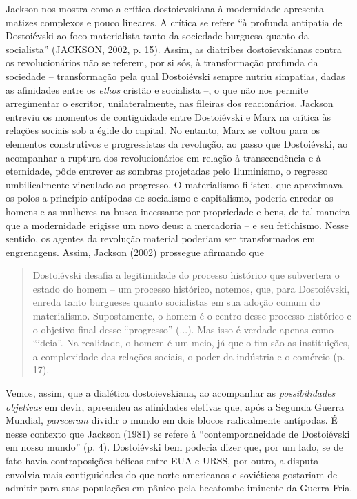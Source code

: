 Jackson nos mostra como a crítica dostoievskiana à modernidade apresenta
matizes complexos e pouco lineares. A crítica se refere ``à profunda
antipatia de Dostoiévski ao foco materialista tanto da sociedade
burguesa quanto da socialista'' (JACKSON, 2002, p. 15). Assim, as
diatribes dostoievskianas contra os revolucionários não se referem, por
si sós, à transformação profunda da sociedade -- transformação pela qual
Dostoiévski sempre nutriu simpatias, dadas as afinidades entre os
\emph{ethos} cristão e socialista --, o que não nos permite arregimentar
o escritor, unilateralmente, nas fileiras dos reacionários. Jackson
entreviu os momentos de contiguidade entre Dostoiévski e Marx na crítica
às relações sociais sob a égide do capital. No entanto, Marx se voltou
para os elementos construtivos e progressistas da revolução, ao passo
que Dostoiévski, ao acompanhar a ruptura dos revolucionários em relação
à transcendência e à eternidade, pôde entrever as sombras projetadas
pelo Iluminismo, o regresso umbilicalmente vinculado ao progresso. O
materialismo filisteu, que aproximava os polos a princípio antípodas de
socialismo e capitalismo, poderia enredar os homens e as mulheres na
busca incessante por propriedade e bens, de tal maneira que a
modernidade erigisse um novo deus: a mercadoria -- e seu fetichismo.
Nesse sentido, os agentes da revolução material poderiam ser
transformados em engrenagens. Assim, Jackson (2002) prossegue afirmando
que

\begin{quote}
Dostoiévski desafia a legitimidade do processo histórico que subvertera
o estado do homem -- um processo histórico, notemos, que, para
Dostoiévski, enreda tanto burgueses quanto socialistas em sua adoção
comum do materialismo. Supostamente, o homem é o centro desse processo
histórico e o objetivo final desse ``progresso'' (...). Mas isso é
verdade apenas como ``ideia''. Na realidade, o homem é um meio, já que o
fim são as instituições, a complexidade das relações sociais, o poder da
indústria e o comércio (p. 17).
\end{quote}

Vemos, assim, que a dialética dostoievskiana, ao acompanhar as
\emph{possibilidades objetivas} em devir, apreendeu as afinidades
eletivas que, após a Segunda Guerra Mundial, \emph{pareceram} dividir o
mundo em dois blocos radicalmente antípodas. É nesse contexto que
Jackson (1981) se refere à ``contemporaneidade de Dostoiévski em nosso
mundo'' (p. 4). Dostoiévski bem poderia dizer que, por um lado, se de
fato havia contraposições bélicas entre EUA e URSS, por outro, a disputa
envolvia mais contiguidades do que norte-americanos e soviéticos
gostariam de admitir para suas populações em pânico pela hecatombe
iminente da Guerra Fria.

